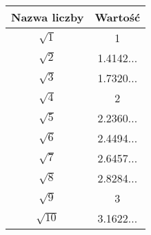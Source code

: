 \documentclass[a4paper,11pt]{article}
\begin{document}
\begin{center}

  \begin{tabular}{|c|c|}
    \hline
    Nazwa liczby & Wartość \\
    \hline
    $\sqrt{ 1 }$ & 1 \\
    $\sqrt{ 2 }$ & 1.4142... \\
    $\sqrt{ 3 }$ & 1.7320... \\
    $\sqrt{ 4 }$ & 2 \\
    $\sqrt{ 5 }$ & 2.2360... \\
    $\sqrt{ 6 }$ & 2.4494... \\
    $\sqrt{ 7 }$ & 2.6457... \\
    $\sqrt{ 8 }$ & 2.8284... \\
    $\sqrt{ 9 }$ & 3 \\
    $\sqrt{ 10 }$ & 3.1622... \\
    \hline
  \end{tabular}

\end{center}
\end{document}
